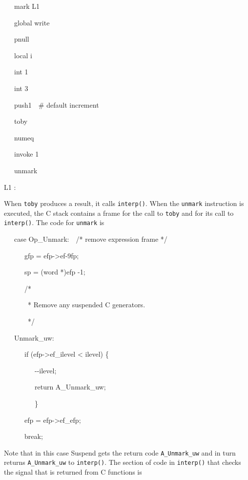{\ttfamily\mdseries
\ \ \ mark L1}

{\ttfamily\mdseries
\ \ \ global write}

{\ttfamily\mdseries
\ \ \ pnull}

{\ttfamily\mdseries
\ \ \ local i}

{\ttfamily\mdseries
\ \ \ int 1}

{\ttfamily\mdseries
\ \ \ int 3}

{\ttfamily\mdseries
\ \ \ push1\ \ \# default increment}

{\ttfamily\mdseries
\ \ \ toby}

{\ttfamily\mdseries
\ \ \ numeq}

{\ttfamily\mdseries
\ \ \ invoke 1}

{\ttfamily\mdseries
\ \ \ unmark}

{\ttfamily\mdseries
L1 :}


When \texttt{toby} produces a result, it calls \texttt{interp()}. When
the \texttt{unmark} instruction is executed, the C stack contains a
frame for the call to \texttt{toby} and for its call to
\texttt{interp()}. The code for \texttt{unmark} is

{\ttfamily\mdseries
\ \ \ case Op\_Unmark:\ \ /* remove expression frame */}

{\ttfamily\mdseries
\ \ \ \ \ \ gfp = efp-{\textgreater}ef-9fp;}

{\ttfamily\mdseries
\ \ \ \ \ \ sp = (word *)efp -1;}

{\ttfamily\mdseries
\ \ \ \ \ \ /*}

{\ttfamily\mdseries
\ \ \ \ \ \ \ * Remove any suspended C generators.}

{\ttfamily\mdseries
\ \ \ \ \ \ \ */}

{\ttfamily\mdseries
\ \ \ Unmark\_uw:}

{\ttfamily\mdseries
\ \ \ \ \ \ if (efp-{\textgreater}ef\_ilevel {\textless} ilevel) \{}

{\ttfamily\mdseries
\ \ \ \ \ \ \ \ \ {}-{}-ilevel;}

{\ttfamily\mdseries
\ \ \ \ \ \ \ \ \ return A\_Unmark\_uw;}

{\ttfamily\mdseries
\ \ \ \ \ \ \ \ \ \}}

{\ttfamily\mdseries
\ \ \ \ \ \ efp = efp-{\textgreater}ef\_efp;}

{\ttfamily\mdseries
\ \ \ \ \ \ break;}

Note that in this case Suspend gets the return code
\texttt{A\_Unmark\_uw} and in turn returns \texttt{A\_Unmark\_uw} to
\texttt{interp()}. The section of code in \texttt{interp()} that
checks the signal that is returned from C functions is

